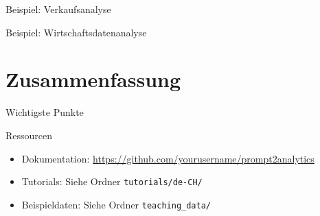 \documentclass[aspectratio=169]{beamer}
\begin{document}
\begin{frame}{Beispiel: Verkaufsanalyse}
\end{frame}

\begin{frame}{Beispiel: Wirtschaftsdatenanalyse}
\end{frame}

\section{Zusammenfassung}

\begin{frame}{Wichtigste Punkte}
\end{frame}

\begin{frame}{Ressourcen}
    \begin{itemize}
        \item Dokumentation: \url{https://github.com/yourusername/prompt2analytics}
        \item Tutorials: Siehe Ordner \texttt{tutorials/de-CH/}
        \item Beispieldaten: Siehe Ordner \texttt{teaching\_data/}
    \end{itemize}
\end{frame}
\end{document}

